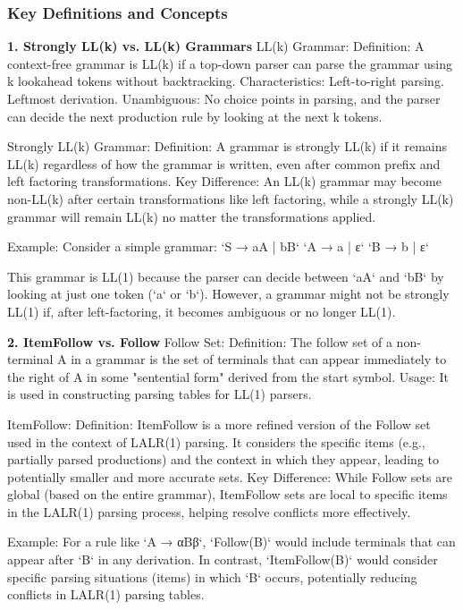 \subsubsection{Key Definitions and Concepts}
\textbf{1. Strongly LL(k) vs. LL(k) Grammars}
LL(k) Grammar:
  Definition: A context-free grammar is LL(k) if a top-down parser can parse the grammar using k lookahead tokens without backtracking.
  Characteristics:
    Left-to-right parsing.
    Leftmost derivation.
    Unambiguous: No choice points in parsing, and the parser can decide the next production rule by looking at the next k tokens.

Strongly LL(k) Grammar:
  Definition: A grammar is strongly LL(k) if it remains LL(k) regardless of how the grammar is written, even after common prefix and left factoring transformations.
  Key Difference: An LL(k) grammar may become non-LL(k) after certain transformations like left factoring, while a strongly LL(k) grammar will remain LL(k) no matter the transformations applied.

Example:
Consider a simple grammar:
  `S → aA | bB`
  `A → a | ε`
  `B → b | ε`

  This grammar is LL(1) because the parser can decide between `aA` and `bB` by looking at just one token (`a` or `b`). However, a grammar might not be strongly LL(1) if, after left-factoring, it becomes ambiguous or no longer LL(1).


\textbf{2. ItemFollow vs. Follow}
Follow Set:
  Definition: The follow set of a non-terminal A in a grammar is the set of terminals that can appear immediately to the right of A in some "sentential form" derived from the start symbol.
  Usage: It is used in constructing parsing tables for LL(1) parsers.

ItemFollow:
  Definition: ItemFollow is a more refined version of the Follow set used in the context of LALR(1) parsing. It considers the specific items (e.g., partially parsed productions) and the context in which they appear, leading to potentially smaller and more accurate sets.
  Key Difference: While Follow sets are global (based on the entire grammar), ItemFollow sets are local to specific items in the LALR(1) parsing process, helping resolve conflicts more effectively.

Example:
For a rule like `A → αBβ`, `Follow(B)` would include terminals that can appear after `B` in any derivation. In contrast, `ItemFollow(B)` would consider specific parsing situations (items) in which `B` occurs, potentially reducing conflicts in LALR(1) parsing tables.


